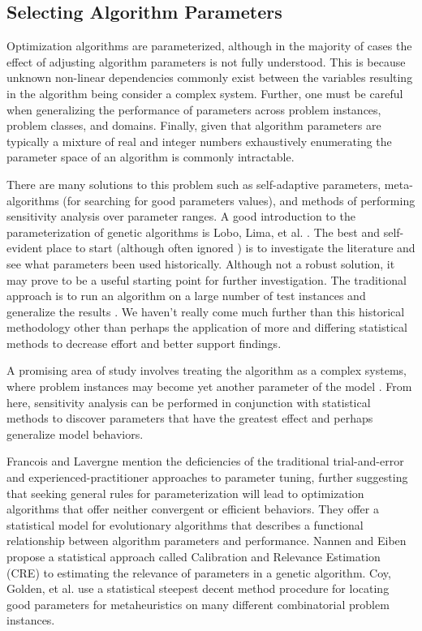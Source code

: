 % 
% 
\subsection{Selecting Algorithm Parameters}
Optimization algorithms are parameterized, although in the majority of cases the effect of adjusting algorithm parameters is not fully understood. This is because unknown non-linear dependencies commonly exist between the variables resulting in the algorithm being consider a complex system. Further, one must be careful when generalizing the performance of parameters across problem instances, problem classes, and domains. Finally, given that algorithm parameters are typically a mixture of real and integer numbers exhaustively enumerating the parameter space of an algorithm is commonly intractable.

There are many solutions to this problem such as self-adaptive parameters, meta-algorithms (for searching for good parameters values), and methods of performing sensitivity analysis over parameter ranges. A good introduction to the parameterization of genetic algorithms is Lobo, Lima, et al. \cite{Lobo2007}. The best and self-evident place to start (although often ignored \cite{Eiben2002}) is to investigate the literature and see what parameters been used historically. Although not a robust solution, it may prove to be a useful starting point for further investigation. The traditional approach is to run an algorithm on a large number of test instances and generalize the results \cite{Schaffer1989}. We haven't really come much further than this historical methodology other than perhaps the application of more and differing statistical methods to decrease effort and better support findings.

A promising area of study involves treating the algorithm as a complex systems, where problem instances may become yet another parameter of the model \cite{Saltelli2002, Campolongo2000}. From here, sensitivity analysis can be performed in conjunction with statistical methods to discover parameters that have the greatest effect \cite{Chan1997} and perhaps generalize model behaviors.

Francois and Lavergne \cite{Francois2001} mention the deficiencies of the traditional trial-and-error and experienced-practitioner approaches to parameter tuning, further suggesting	that seeking general rules for parameterization will lead to optimization algorithms that offer neither convergent or efficient behaviors. They offer a statistical model for evolutionary algorithms that describes a functional relationship between algorithm parameters and performance. Nannen and Eiben \cite{Nannen2007, Nannen2006} propose a statistical approach called Calibration and Relevance Estimation (CRE) to estimating the relevance of parameters in a genetic algorithm. Coy, Golden, et al. \cite{Coy2001} use a statistical steepest decent method procedure for locating good parameters for metaheuristics on many different combinatorial problem instances.

